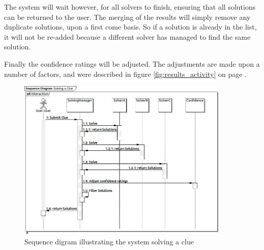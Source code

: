 The system will wait however, for all solvers to finish, ensuring that all 
solutions can be returned to the user. The merging of the results will simply 
remove any duplicate solutions, upon a first come basis. So if a solution is 
already in the list, it will not be re-added because a different solver has 
managed to find the same solution.

Finally the confidence ratings will be adjusted. The adjustments are made upon 
a number of factors, and were described in figure \ref{fig:results_activity} on
page \pageref{fig:results_activity}.

\begin{figure}[H]
  \centering
  \includegraphics[width=0.9\textwidth]{design/sequence/solving_a_clue.jpg}
  \caption{Sequence digram illustrating the system solving a clue}
  \label{fig:solving_clue_sequence}
\end{figure}
